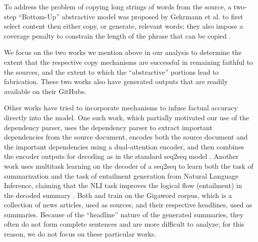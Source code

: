 \documentclass{article}
\begin{document}
To address the problem of copying long strings of words from the source, a two-step ``Bottom-Up'' abstractive model was proposed by Gehrmann et al. to first select content then either copy, or generate, relevant words; they also impose a coverage penalty to constrain the length of the phrase that can be copied \cite{gehrmann2018bottom}. %

We focus on the two works we mention above in our analysis to determine the extent that the respective copy mechanisms are successful in remaining faithful to the sources, and the extent to which the ``abstractive'' portions lead to fabrication. These two works also have generated outputs that are readily available on their GitHubs. 

Other works have tried to incorporate mechanisms to infuse factual accuracy directly into the model. One such work, which partially motivated our use of the dependency parser, uses the dependency parser to extract important dependencies from the source document, encodes both the source document and the important dependencies using a dual-attention encoder, and then combines the encoder outputs for decoding as in the standard seq2seq model \cite{cao2018faithful}. Another work uses multitask learning on the decoder of a seq2seq to learn both the task of summarization and the task of entailment generation from Natural Language Inference, claiming that the NLI task improves the logical flow (entailment) in the decoded summary \cite{pasunuru2017towards}. Both \cite{pasunuru2017towards} and \cite{cao2018faithful} train on the Gigaword corpus, which is a collection of news articles, used as sources, and their respective headlines, used as summaries. Because of the ``headline'' nature of the generated summaries, they often do not form complete sentences and are more difficult to analyze; for this reason, we do not focus on these particular works.

\end{document}
